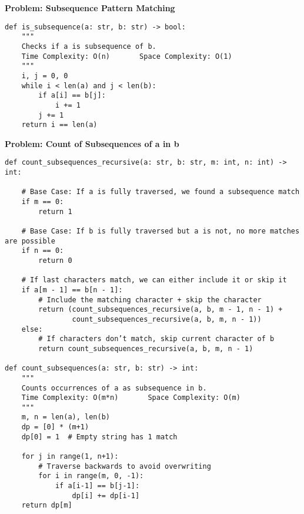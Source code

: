 \noindent\textbf{Problem: Subsequence Pattern Matching}
\begin{verbatim}
def is_subsequence(a: str, b: str) -> bool:
    """
    Checks if a is subsequence of b.
    Time Complexity: O(n)       Space Complexity: O(1)
    """
    i, j = 0, 0
    while i < len(a) and j < len(b):
        if a[i] == b[j]:
            i += 1
        j += 1
    return i == len(a)
\end{verbatim}

\noindent\textbf{Problem: Count of Subsequences of a in b}
\begin{verbatim}
def count_subsequences_recursive(a: str, b: str, m: int, n: int) -> int:

    # Base Case: If a is fully traversed, we found a subsequence match
    if m == 0:
        return 1

    # Base Case: If b is fully traversed but a is not, no more matches are possible
    if n == 0:
        return 0

    # If last characters match, we can either include it or skip it
    if a[m - 1] == b[n - 1]:
        # Include the matching character + skip the character
        return (count_subsequences_recursive(a, b, m - 1, n - 1) +
                count_subsequences_recursive(a, b, m, n - 1))
    else:
        # If characters don’t match, skip current character of b
        return count_subsequences_recursive(a, b, m, n - 1)
        
def count_subsequences(a: str, b: str) -> int:
    """
    Counts occurrences of a as subsequence in b.
    Time Complexity: O(m*n)       Space Complexity: O(m)
    """
    m, n = len(a), len(b)
    dp = [0] * (m+1)
    dp[0] = 1  # Empty string has 1 match
    
    for j in range(1, n+1):
        # Traverse backwards to avoid overwriting
        for i in range(m, 0, -1):
            if a[i-1] == b[j-1]:
                dp[i] += dp[i-1]
    return dp[m]
\end{verbatim}

